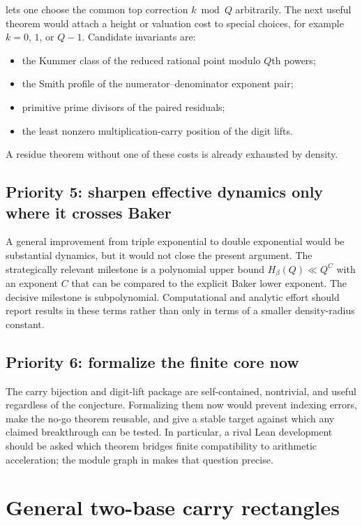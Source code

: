 \documentclass[11pt]{article}
\theoremstyle{definition}
\theoremstyle{remark}
\begin{document}
 lets one choose the common top correction
$k\bmod Q$ arbitrarily.  The next useful theorem would attach a height or valuation
cost to special choices, for example $k=0$, $1$, or $Q-1$.  Candidate invariants are:
\begin{itemize}
\item the Kummer class of the reduced rational point modulo $Q$th powers;
\item the Smith profile of the numerator--denominator exponent pair;
\item primitive prime divisors of the paired residuals;
\item the least nonzero multiplication-carry position of the digit lifts.
\end{itemize}
A residue theorem without one of these costs is already exhausted by density.

\subsection{Priority 5: sharpen effective dynamics only where it crosses Baker}

A general improvement from triple exponential to double exponential would be
substantial dynamics, but it would not close the present argument.  The strategically
relevant milestone is a polynomial upper bound
$H_\beta(Q)\ll Q^C$ with an exponent $C$ that can be compared to the explicit Baker
lower exponent.  The decisive milestone is subpolynomial.  Computational and
analytic effort should report results in these terms rather than only in terms of a
smaller density-radius constant.

\subsection{Priority 6: formalize the finite core now}

The carry bijection and digit-lift package are self-contained, nontrivial, and useful
regardless of the conjecture.  Formalizing them now would prevent indexing errors,
make the no-go theorem reusable, and give a stable target against which any claimed
breakthrough can be tested.  In particular, a rival Lean development should be asked
which theorem bridges finite compatibility to arithmetic acceleration; the module
graph in  makes that question precise.

\section{General two-base carry rectangles}
\label{sec:general-bases}
\end{document}
